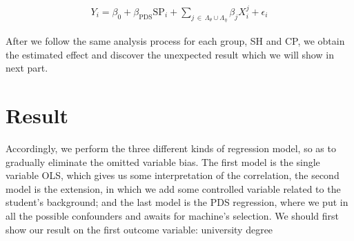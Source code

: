 \documentclass[]{AEA}
\begin{document}
    \begin{align}
        Y_i = \beta_0 + \beta_{\text{PDS}}\text{SP}_i + \sum_{j \,\in\, \Lambda_\theta \cup \Lambda_\eta} \beta_j X_i^j + \epsilon_i
    \end{align}

    After we follow the same analysis process for each group, SH and CP, we obtain the estimated effect and discover the unexpected result which we will show in next part.


\section{Result}

    Accordingly, we perform the three different kinds of regression model, so as to gradually eliminate the omitted variable bias.  The first model is the single variable OLS, which gives us some interpretation of the correlation, the second model is the extension, in which we add some controlled variable related to the student's background; and the last model is the PDS regression, where we put in all the possible confounders and awaits for machine's selection.  We should first show our result on the first outcome variable: university degree
\end{document}
